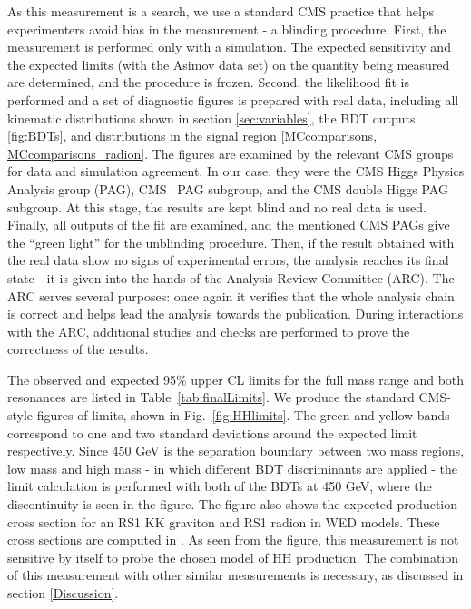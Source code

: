 As this measurement is a search, we use a standard CMS practice that helps experimenters avoid bias in the measurement - a blinding procedure. First, the measurement is performed only with a simulation. The expected sensitivity and the expected limits (with the Asimov data set) on the quantity being measured are determined, and the procedure is frozen. Second, the likelihood fit is performed and a set of diagnostic figures is prepared with real data, including all kinematic distributions shown in section \ref{sec:variables}, the BDT outputs \ref{fig:BDTs}, and \mTHH distributions in the signal region \ref{MCcomparisons, MCcomparisons_radion}. The figures are examined by the relevant CMS groups for data and simulation agreement. In our case, they were the CMS Higgs Physics Analysis group (PAG), CMS \HZZ~PAG subgroup, and the CMS double Higgs PAG subgroup. At this stage, the results are kept blind and no real data is used. Finally, all outputs of the fit are examined, and the mentioned CMS PAGs give the ``green light'' for the unblinding procedure. Then, if the result obtained with the real data show no signs of experimental errors, the analysis reaches its final state - it is given into the hands of the Analysis Review Committee (ARC). The ARC serves several purposes: once again it verifies that the whole analysis chain is correct and helps lead the analysis towards the publication. During interactions with the ARC, additional studies and checks are performed to prove the correctness of the results. 

The observed and expected 95\% upper CL limits for the full mass range and both resonances are listed in Table~\ref{tab:finalLimits}. We produce the standard CMS-style figures of limits, shown in Fig.~\ref{fig:HHlimits}. The green and yellow bands correspond to one and two standard deviations around the expected limit respectively. Since 450 GeV is the separation boundary between two mass regions, low mass and high mass - in which different BDT discriminants are applied - the limit calculation is performed with both of the BDTs at 450 GeV, where the discontinuity is
seen in the figure. The figure also shows the expected production cross section for an RS1 KK graviton and RS1 radion in WED models. These cross sections are computed in \cite{Oliveira:2014kla}. As seen from the figure, this measurement is not sensitive by itself to probe the chosen model of HH production. The combination of this measurement with other similar measurements is necessary, as discussed in section \ref{Discussion}.

